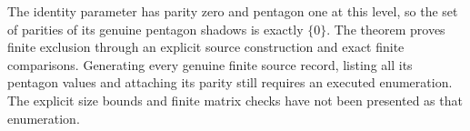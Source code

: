The identity parameter has parity zero and pentagon one
at this level, so the set of parities of its genuine
pentagon shadows is exactly $\{0\}$.
The theorem proves finite exclusion through an explicit
source construction and exact finite comparisons.
Generating every genuine finite source record, listing
all its pentagon values and attaching its parity still
requires an executed enumeration.  The explicit size
bounds and finite matrix checks have not been presented
as that enumeration.

